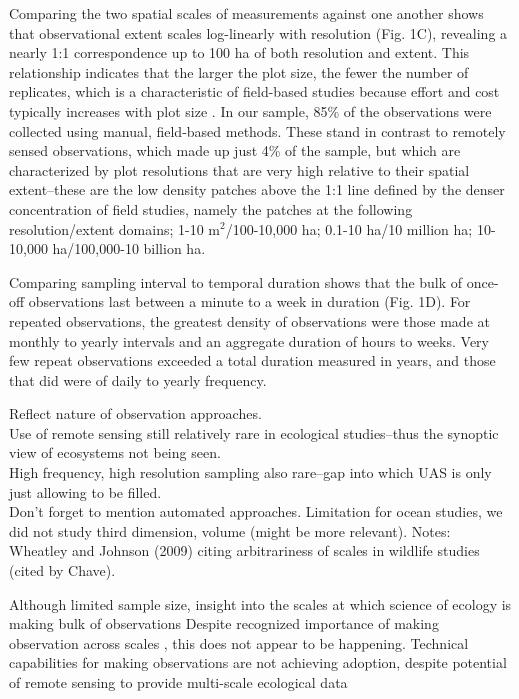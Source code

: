 \documentclass[12pt]{article}
\begin{document}
Comparing the two spatial scales of measurements against one another shows that observational extent scales log-linearly with resolution (Fig. 1C), revealing a nearly 1:1 correspondence up to 100 ha of both resolution and extent. This relationship indicates that the larger the plot size, the fewer the number of replicates, which is a characteristic of field-based studies because effort and cost typically increases with plot size \cite{kareiva_spatial_1988}. In our sample, 85\% of the observations were collected using manual, field-based methods. These stand in contrast to remotely sensed observations, which made up just 4\% of the sample, but which are characterized by plot resolutions that are very high relative to their spatial extent--these are the low density patches above the 1:1 line defined by the denser concentration of field studies, namely the patches at the following resolution/extent domains; 1-10 m$^2$/100-10,000 ha; 0.1-10 ha/10 million ha; 10-10,000 ha/100,000-10 billion ha.  

Comparing sampling interval to temporal duration shows that the bulk of once-off observations last between a minute to a week in duration (Fig. 1D). For repeated observations, the greatest density of observations were those made at monthly to yearly intervals and an aggregate duration of hours to weeks.  Very few repeat observations exceeded a total duration measured in years, and those that did were of daily to yearly frequency.  

Reflect nature of observation approaches. \\
Use of remote sensing still relatively rare in ecological studies--thus the synoptic view of ecosystems not being seen.  \\
High frequency, high resolution sampling also rare--gap into which UAS is only just allowing to be filled. \\
Don't forget to mention automated approaches. 
Limitation for ocean studies, we did not study third dimension, volume (might be more relevant).
Notes: Wheatley and Johnson (2009) citing arbitrariness of scales in wildlife studies (cited by Chave). 

Although limited sample size, insight into the scales at which science of ecology is making bulk of observations
Despite recognized importance of making observation across scales \cite{levin_problem_1992}, this does not appear to be happening. 
Technical capabilities for making observations are not achieving adoption, despite potential of remote sensing to provide multi-scale ecological data \
\end{document}

